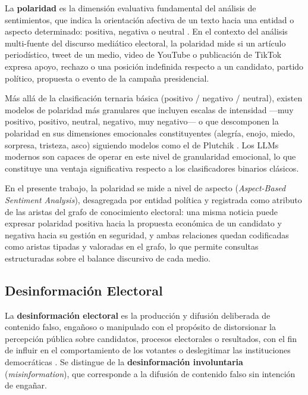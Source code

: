 La \textbf{polaridad} es la dimensión evaluativa fundamental del análisis de sentimientos, que indica la orientación afectiva de un texto hacia una entidad o aspecto determinado: positiva, negativa o neutral \parencite{tec_liu2012sentiment}. En el contexto del análisis multi-fuente del discurso mediático electoral, la polaridad mide si un artículo periodístico, tweet de un medio, video de YouTube o publicación de TikTok expresa apoyo, rechazo o una posición indefinida respecto a un candidato, partido político, propuesta o evento de la campaña presidencial.

Más allá de la clasificación ternaria básica (positivo / negativo / neutral), existen modelos de polaridad más granulares que incluyen escalas de intensidad —muy positivo, positivo, neutral, negativo, muy negativo— o que descomponen la polaridad en sus dimensiones emocionales constituyentes (alegría, enojo, miedo, sorpresa, tristeza, asco) siguiendo modelos como el de Plutchik \parencite{mc_plutchik1980emotion}. Los LLMs modernos son capaces de operar en este nivel de granularidad emocional, lo que constituye una ventaja significativa respecto a los clasificadores binarios clásicos.

En el presente trabajo, la polaridad se mide a nivel de aspecto (\textit{Aspect-Based Sentiment Analysis}), desagregada por entidad política y registrada como atributo de las aristas del grafo de conocimiento electoral: una misma noticia puede expresar polaridad positiva hacia la propuesta económica de un candidato y negativa hacia su gestión en seguridad, y ambas relaciones quedan codificadas como aristas tipadas y valoradas en el grafo, lo que permite consultas estructuradas sobre el balance discursivo de cada medio.

\subsection{Desinformación Electoral}

La \textbf{desinformación electoral} es la producción y difusión deliberada de contenido falso, engañoso o manipulado con el propósito de distorsionar la percepción pública sobre candidatos, procesos electorales o resultados, con el fin de influir en el comportamiento de los votantes o deslegitimar las instituciones democráticas \parencite{mc_wardle2017information}. Se distingue de la \textbf{desinformación involuntaria} (\textit{misinformation}), que corresponde a la difusión de contenido falso sin intención de engañar.

